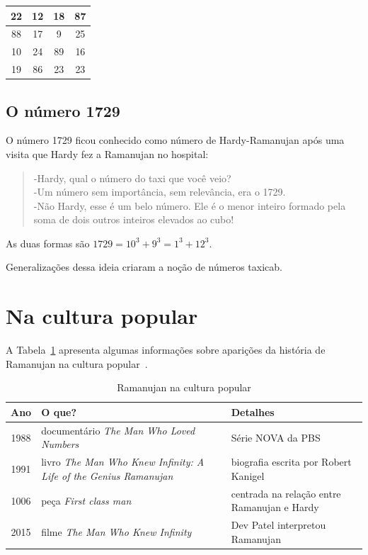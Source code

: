 \documentclass[12pt, a4paper]{article}
\begin{document}
\begin{center}
    \begin{tabular}{|c|c|c|c|}
        \hline
        22 & 12 & 18 & 87 \\ \hline
        88 & 17 & 9 & 25 \\ \hline
        10 & 24 & 89 & 16 \\ \hline
        19 & 86 & 23 & 23 \\ \hline
    \end{tabular}
\end{center}

\subsection{O número 1729}

\noindent
O número 1729 ficou conhecido como número de Hardy-Ramanujan após uma visita que
Hardy fez a Ramanujan no hospital:

\begin{quote}
-Hardy, qual o número do taxi que você veio?\\
-Um número sem importância, sem relevância, era o 1729.\\
-Não Hardy, esse é um belo número. Ele é o menor inteiro formado pela soma de 
 dois outros inteiros elevados ao cubo!
\end{quote}

As duas formas são $ 1729 = 10^3 + 9^3 = 1^3 + 12^3 $.

Generalizações dessa ideia criaram a noção de números taxicab.

\section{Na cultura popular}\label{sec:cultura_popular}

\noindent
A Tabela~\ref{table:na_cultura_popular} apresenta algumas informações sobre
aparições da história de Ramanujan na cultura popular~\cite{wikipedia}.

\begin{table}[h!]
    \caption{Ramanujan na cultura popular}\label{table:na_cultura_popular}
    \centering
    \begin{tabular}{c||p{}|p{}}
        \textbf{ Ano } & \textbf{ O que? } & \textbf{ Detalhes } \\ \hline
        1988 & documentário \textit{The Man Who Loved Numbers} & Série NOVA da
        PBS \\ \hline
        1991 & livro \textit{The Man Who Knew Infinity: A Life of the Genius
        Ramanujan} & biografia escrita por Robert Kanigel \\ \hline
        1006 & peça \textit{First class man} & centrada na relação entre
        Ramanujan e Hardy \\ \hline
        2015 & filme \textit{The Man Who Knew Infinity} & Dev Patel interpretou
        Ramanujan \\ \hline
    \end{tabular}
\end{table}
\end{document}
